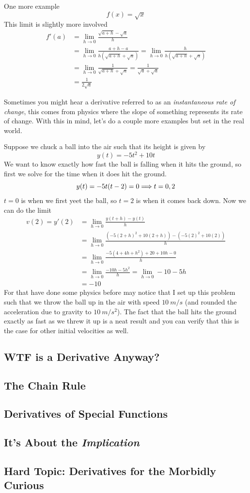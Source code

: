 \newpage 
\begin{example}
	One more example
	\[ f(x) = \sqrt{x} \]
	This limit is slightly more involved
	\begin{align*}
		f'(a) &= \lim_{h \to 0} \frac{\sqrt{a + h} - \sqrt{a}}{h} \\
		&= \lim_{h \to 0} \frac{a + h - a}{h (\sqrt{a + h} + \sqrt{a})} = \lim_{h \to 0} \frac{h}{h(\sqrt{a + h} + \sqrt{a})} \\
		&= \lim_{h \to 0} \frac{1}{\sqrt{a + h} + \sqrt{a}} = \frac{1}{\sqrt{a} + \sqrt{a}} \\
		&= \frac{1}{2 \sqrt{a}}
	\end{align*}
\end{example}

Sometimes you might hear a derivative referred to as an \emph{instantaneous rate of change}, this comes from physics where the slope of something represents its rate of change. With this in mind, let's do a couple more examples but set in the real world.

\begin{example}
	Suppose we chuck a ball into the air such that its height is given by
	\[ y(t) = -5t^2 + 10t \]
	We want to know exactly how fast the ball is falling when it hits the ground, so first we solve for the time when it does hit the ground.
	\[ y(t) = -5t(t - 2) = 0 \Longrightarrow t = 0, 2 \]
	$t = 0$ is when we first yeet the ball, so $t = 2$ is when it comes back down. Now we can do the limit
	\begin{align*}
		v(2) = y'(2) &= \lim_{h \to 0} \frac{y(t + h) - y(t)}{h} \\
		&= \lim_{h \to 0} \frac{(-5(2 + h)^2 + 10(2 + h)) - (-5(2)^2 + 10(2))}{h} \\
		&= \lim_{h \to 0} \frac{-5(4 + 4h + h^2) + 20 + 10h - 0}{h} \\
		&= \lim_{h \to 0} \frac{-10h - 5h^2}{h} = \lim_{h \to 0} -10 - 5h \\
		&= -10
	\end{align*}
	For that have done some physics before may notice that I set up this problem such that we throw the ball up in the air with speed $\SI{10}{m/s}$ (and rounded the acceleration due to gravity to $\SI{10}{m/s^2}$). The fact that the ball hits the ground exactly as fast as we threw it up is a neat result and you can verify that this is the case for other initial velocities as well.
\end{example}

\newpage 
\subsection{WTF is a Derivative Anyway?}
\subsection{The Chain Rule}
\subsection{Derivatives of Special Functions}
\subsection{It's About the \emph{Implication}}
\subsection{Hard Topic: Derivatives for the Morbidly Curious}